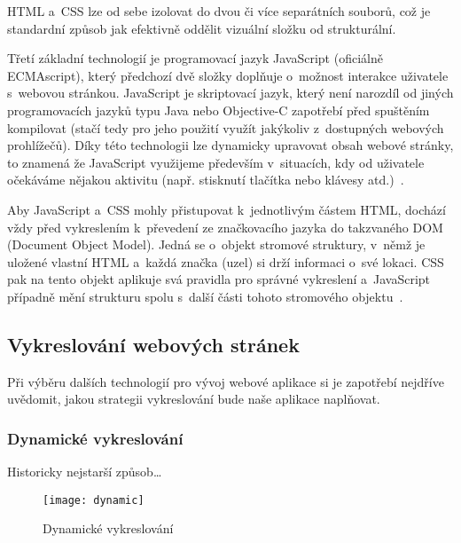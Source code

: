 HTML a~CSS lze od sebe izolovat do dvou či více separátních souborů, což je standardní způsob jak efektivně oddělit vizuální složku od strukturální.

Třetí základní technologií je programovací jazyk JavaScript (oficiálně ECMAscript), který předchozí dvě složky doplňuje o~možnost interakce uživatele s~webovou stránkou. JavaScript je skriptovací jazyk, který není narozdíl od jiných programovacích jazyků typu Java nebo Objective-C zapotřebí před spuštěním kompilovat (stačí tedy pro jeho použití využít jakýkoliv z~dostupných webových prohlížečů). Díky této technologii lze dynamicky upravovat obsah webové stránky, to znamená že JavaScript využijeme především v~situacích, kdy od uživatele očekáváme nějakou aktivitu (např. stisknutí tlačítka nebo klávesy atd.)~\parencite{javascript}.

Aby JavaScript a~CSS mohly přistupovat k~jednotlivým částem HTML, dochází vždy před vykreslením k~převedení ze značkovacího jazyka do takzvaného DOM (Document Object Model). Jedná se o~objekt stromové struktury, v~němž je uložené vlastní HTML a~každá značka (uzel) si drží informaci o~své lokaci. CSS pak na tento objekt aplikuje svá pravidla pro správné vykreslení a~JavaScript případně mění strukturu spolu s~další části tohoto stromového objektu~\parencite{howbrowserswork}.

\hypertarget{vykreslovuxe1nuxed-webovuxfdch-struxe1nek}{%
\subsection{Vykreslování webových stránek}\label{vykreslovuxe1nuxed-webovuxfdch-struxe1nek}}

Při výběru dalších technologií pro vývoj webové aplikace si je zapotřebí nejdříve uvědomit, jakou strategii vykreslování bude naše aplikace naplňovat.

\hypertarget{dynamickuxe9-vykreslovuxe1nuxed}{%
\subsubsection{Dynamické vykreslování}\label{dynamickuxe9-vykreslovuxe1nuxed}}

Historicky nejstarší způsob\ldots{}

\begin{figure}[ht]   
    \centering
    \texttt{[image: dynamic]}  
    \caption{Dynamické vykreslování}
    \label{algoritmus}
 \end{figure}